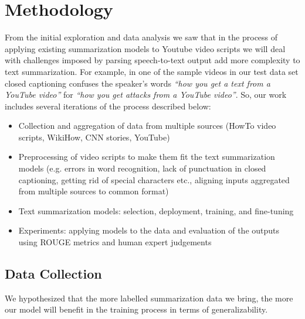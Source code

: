 \documentclass{article}
\begin{document}
 
\section{Methodology}

From the initial exploration and data analysis we saw that in the process of applying existing summarization models to Youtube video scripts  we will deal with challenges imposed by parsing speech-to-text output add more complexity to text summarization. For example, in one of the sample videos in our test data set closed captioning confuses the speaker’s words \emph{“how you get a text from a YouTube video”} for  \emph{“how you get attacks from a YouTube video”}. So, our work includes several iterations of the process described below:
\begin{itemize}
\item Collection and aggregation of data from multiple sources (HowTo video scripts, WikiHow, CNN stories, YouTube)
\item Preprocessing of video scripts to make them fit the text summarization models (e.g. errors in word recognition, lack of punctuation in closed captioning, getting rid of special characters etc., aligning inputs aggregated from multiple sources  to common format)
\item Text summarization models: selection, deployment, training,  and fine-tuning 
\item Experiments: applying models to the data and evaluation of the outputs using ROUGE metrics and human expert judgements
\end{itemize}
 
\subsection{Data Collection}
We hypothesized that the more labelled summarization data we bring, the more our model will benefit in the training process in terms of generalizability. 
\end{document}
